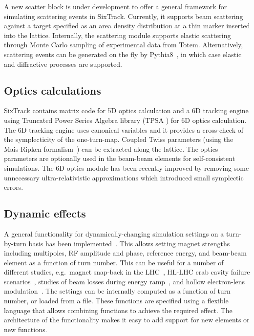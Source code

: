 \documentclass{ws-ijmpa}
\begin{document}
A new scatter block is under development to offer a general framework for simulating scattering events in SixTrack. Currently, it supports beam scattering against a target specified as an area density distribution at a thin marker inserted into the lattice.
Internally, the scattering module supports elastic scattering through Monte Carlo sampling of experimental data from Totem. Alternatively, scattering events can be generated on the fly by Pythia8~\cite{pythia8}, in which case elastic and diffractive processes are supported.

\subsection{Optics calculations}

SixTrack contains matrix code for 5D optics calculation and a 6D tracking engine using Truncated Power Series Algebra library (TPSA \cite{tpsa}) for 6D optics calculation. The 6D tracking engine uses canonical variables and it provides a cross-check of the symplecticity of the one-turn-map. Coupled Twiss parameters (using the Mais-Ripken formalism~\cite{maisripken}) can be extracted along the lattice. The optics parameters are optionally used in the beam-beam elements for self-consistent simulations. The 6D optics module has been recently improved by removing some unnecessary ultra-relativistic approximations which introduced small symplectic errors.

\subsection{Dynamic effects}

A general functionality for dynamically-changing simulation settings on a turn-by-turn basis has been implemented~\cite{dynk,dynk2}. This allows setting magnet strengths including multipoles, RF amplitude and phase, reference energy, and beam-beam element as a function of turn number. This can be useful for a number of different studies, e.g.\  magnet snap-back in the LHC~\cite{snapback_lhc}, HL-LHC crab cavity failure scenarios~\cite{crabfail1,crabfail2,crabfail3}, studies of beam losses during energy ramp~\cite{modulation}, and hollow electron-lens modulation~\cite{elens-miriam}. The settings can be internally computed as a function of turn number, or loaded from a file. These functions are specified using a flexible language that  allows combining functions to achieve the required effect. The architecture of the functionality makes it easy to add support for new elements or new functions.
\end{document}
